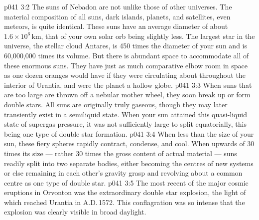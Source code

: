 \vs p041 3:2 The suns of Nebadon are not unlike those of other universes. The material composition of all suns, dark islands, planets, and satellites, even meteors, is quite identical. These suns have an average diameter of about $1.6\times 10^6$\,km, that of your own solar orb being slightly less. The largest star in the universe, the stellar cloud Antares, is 450 times the diameter of your sun and is 60,000,000 times its volume. But there is abundant space to accommodate all of these enormous suns. They have just as much comparative elbow room in space as one dozen oranges would have if they were circulating about throughout the interior of Urantia, and were the planet a hollow globe.
\vs p041 3:3 \pc When suns that are too large are thrown off a nebular mother wheel, they soon break up or form double stars. All suns are originally truly gaseous, though they may later transiently exist in a semiliquid state. When your sun attained this quasi\hyp{}liquid state of supergas pressure, it was not sufficiently large to split equatorially, this being one type of double star formation.
\vs p041 3:4 When less than  the size of your sun, these fiery spheres rapidly contract, condense, and cool. When upwards of 30 times its size --- rather 30 times the gross content of actual material --- suns readily split into two separate bodies, either becoming the centres of new systems or else remaining in each other’s gravity grasp and revolving about a common centre as one type of double star.
\vs p041 3:5 \pc The most recent of the major cosmic eruptions in Orvonton was the extraordinary double star explosion, the light of which reached Urantia in A.D.\,1572. This conflagration was so intense that the explosion was clearly visible in broad daylight.
